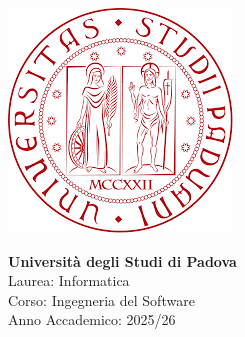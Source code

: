 \documentclass[a4paper,12pt]{article}
\begin{document}
\vspace*{\fill} %

\begin{center}
    \begin{minipage}{0.25\textwidth}
        \centering
        \includegraphics[width=\linewidth]{logoUni.png}
    \end{minipage}
    \hfill
    \begin{minipage}{0.7\textwidth}
        \raggedright
        {\color{red}\LARGE \textbf{Università degli Studi di Padova}}\\[0.3cm]
        {\large
        Laurea: Informatica\\
        Corso: Ingegneria del Software\\
        Anno Accademico: 2025/26
        }
    \end{minipage}
\end{center}

\vspace{1cm}
\end{document}
